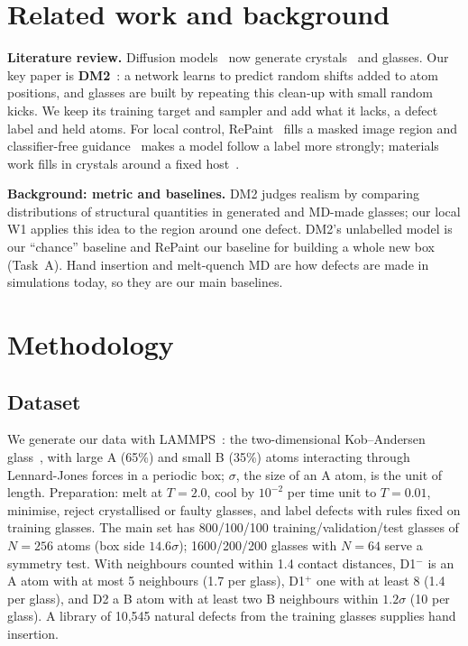 \documentclass[10pt]{article}
\newcommand{\Dm}{D1$^{-}$}
\newcommand{\Dp}{D1$^{+}$}
\begin{document}
\section{Related work and background}

\textbf{Literature review.} Diffusion models~\citep{ho2020ddpm,song2021sde} now generate crystals~\citep{xie2022cdvae,jiao2023diffcsp,zeni2025mattergen} and glasses. Our key paper is \textbf{DM2}~\citep{yang2026dm2}: a network learns to predict random shifts added to atom positions, and glasses are built by repeating this clean-up with small random kicks. We keep its training target and sampler and add what it lacks, a defect label and held atoms. For local control, RePaint~\citep{lugmayr2022repaint} fills a masked image region and classifier-free guidance~\citep{ho2022cfg} makes a model follow a label more strongly; materials work fills in crystals around a fixed host~\citep{zhong2025inpainting}.

\textbf{Background: metric and baselines.} DM2 judges realism by comparing distributions of structural quantities in generated and MD-made glasses; our local W1 applies this idea to the region around one defect. DM2's unlabelled model is our ``chance'' baseline and RePaint our baseline for building a whole new box (Task~A). Hand insertion and melt-quench MD are how defects are made in simulations today, so they are our main baselines.

\section{Methodology}

\subsection{Dataset}
We generate our data with LAMMPS~\citep{thompson2022lammps}: the two-dimensional Kob--Andersen glass~\citep{kob1995,bruning2009}, with large A (65\%) and small B (35\%) atoms interacting through Lennard-Jones forces in a periodic box; $\sigma$, the size of an A atom, is the unit of length. Preparation: melt at $T=2.0$, cool by $10^{-2}$ per time unit to $T=0.01$, minimise, reject crystallised or faulty glasses, and label defects with rules fixed on training glasses. The main set has 800/100/100 training/validation/test glasses of $N=256$ atoms (box side $14.6\sigma$); 1600/200/200 glasses with $N=64$ serve a symmetry test. With neighbours counted within 1.4 contact distances, \Dm{} is an A atom with at most 5 neighbours (1.7 per glass), \Dp{} one with at least 8 (1.4 per glass), and D2 a B atom with at least two B neighbours within $1.2\sigma$ (10 per glass). A library of 10,545 natural defects from the training glasses supplies hand insertion.
\end{document}
